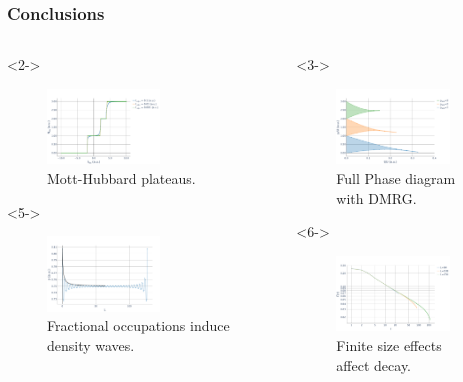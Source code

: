 \documentclass[aspectratio=169]{beamer}
\begin{document}
\begin{frame}
  \frametitle{Conclusions}
  \begin{columns}[onlytextwidth]
    \begin{column}{0.33\textwidth}
      \begin{onlyenv}<2->
        \begin{figure}[ht]
          \centering
          \includegraphics[height=2cm, width=\textwidth,keepaspectratio]{../img/BH-3in3-NvsMu.pdf}
          \caption*{Mott-Hubbard plateaus.}
        \end{figure}   
      \end{onlyenv}

      \begin{onlyenv}<5->
        \begin{figure}[ht]
          \centering
          \includegraphics[height=2cm, width=\textwidth,keepaspectratio]{../img/Density-profiles-fractional-density.pdf}
          \caption*{Fractional occupations induce density waves.}
        \end{figure}   
      \end{onlyenv}
    \end{column}

    \begin{column}{0.33\textwidth}
      \begin{onlyenv}<3->
        \begin{figure}[ht]
          \centering
          \includegraphics[height=2cm, width=\textwidth,keepaspectratio]{../img/Mott-Lobes.pdf}
          \caption*{Full Phase diagram with DMRG.}
        \end{figure}   
      \end{onlyenv}

      \begin{onlyenv}<6->
        \begin{figure}[ht]
          \centering
          \includegraphics[height=2cm, width=\textwidth,keepaspectratio]{../img/Correlations-lengths.pdf}
          \caption*{Finite size effects affect decay.}
        \end{figure}   
      \end{onlyenv}
    \end{column}


\end{columns}
\end{frame}
\end{document}
